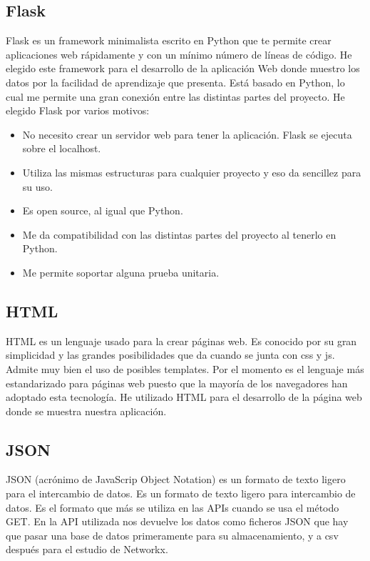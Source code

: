 \subsection{Flask}

Flask es un framework minimalista escrito en Python que te permite crear aplicaciones web rápidamente y con un mínimo número de líneas de código. \cite{flask}
He elegido este framework para el desarrollo de la aplicación Web donde muestro los datos por la facilidad de aprendizaje que presenta. Está basado en Python, lo cual me permite una gran conexión entre las distintas partes del proyecto.
He elegido Flask por varios motivos:

\begin{itemize}
    \item No necesito crear un servidor web para tener la aplicación. Flask se ejecuta sobre el localhost.
    \item Utiliza las mismas estructuras para cualquier proyecto y eso da sencillez para su uso.
    \item Es open source, al igual que Python.
    \item Me da compatibilidad con las distintas partes del proyecto al tenerlo en Python.
    \item Me permite soportar alguna prueba unitaria.
\end{itemize}

\subsection{HTML}
HTML es un lenguaje usado para la crear páginas web. \cite{wiki:HTML}
Es conocido por su gran simplicidad y las grandes posibilidades que da cuando se junta con css y js. Admite muy bien el uso de posibles templates.
Por el momento es el lenguaje más estandarizado para páginas web puesto que la mayoría de los navegadores han adoptado esta tecnología.
He utilizado HTML para el desarrollo de la página web donde se muestra nuestra aplicación.

\subsection{JSON}
JSON (acrónimo de JavaScrip Object Notation) es un formato de texto ligero para el intercambio de datos. Es un formato de texto ligero para intercambio de datos. \cite{wiki:JSON}
Es el formato que más se utiliza en las APIs cuando se usa el método GET. En la API utilizada nos devuelve los datos como ficheros JSON que hay que pasar una base de datos primeramente para su almacenamiento, y a csv después para el estudio de Networkx.

